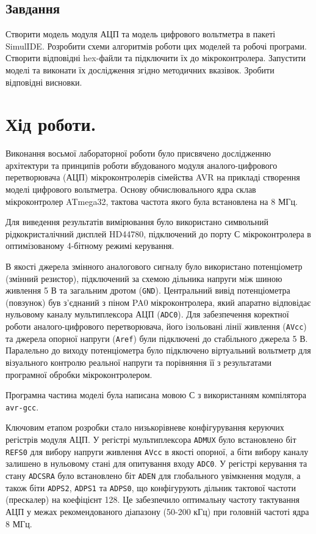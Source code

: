 \documentclass[14pt, a4paper]{extreport}
\begin{document}
	\subsection*{Завдання}
	Створити модель модуля АЦП та модель цифрового вольтметра в пакеті SimulIDE. Розробити схеми алгоритмів роботи цих моделей та робочі програми. Створити відповідні hex-файли та підключити їх до мікроконтролера. Запустити моделі та виконати їх дослідження згідно методичних вказівок. Зробити відповідні висновки.
	
	\section*{Хід роботи.}
	
	Виконання восьмої лабораторної роботи було присвячено дослідженню архітектури та принципів роботи вбудованого модуля аналого-цифрового перетворювача (АЦП) мікроконтролерів сімейства AVR на прикладі створення моделі цифрового вольтметра. Основу обчислювального ядра склав мікроконтролер ATmega32, тактова частота якого була встановлена на 8 МГц. 
	
	
	Для виведення результатів вимірювання було використано символьний рідкокристалічний дисплей HD44780, підключений до порту С мікроконтролера в оптимізованому 4-бітному режимі керування. 
	
	В якості джерела змінного аналогового сигналу було використано потенціометр (змінний резистор), підключений за схемою дільника напруги між шиною живлення 5 В та загальним дротом (\texttt{GND}). Центральний вивід потенціометра (повзунок) був з'єднаний з піном PA0 мікроконтролера, який апаратно відповідає нульовому каналу мультиплексора АЦП (\texttt{ADC0}). Для забезпечення коректної роботи аналого-цифрового перетворювача, його ізольовані лінії живлення (\texttt{AVcc}) та джерела опорної напруги (\texttt{Aref}) були підключені до стабільного джерела 5 В. Паралельно до виходу потенціометра було підключено віртуальний вольтметр для візуального контролю реальної напруги та порівняння її з результатами програмної обробки мікроконтролером.
	
	
	Програмна частина моделі була написана мовою С з використанням компілятора \texttt{avr-gcc}. 
	
	
	Ключовим етапом розробки стало низькорівневе конфігурування керуючих регістрів модуля АЦП. У регістрі мультиплексора \texttt{ADMUX} було встановлено біт \texttt{REFS0} для вибору напруги живлення \texttt{AVcc} в якості опорної, а біти вибору каналу залишено в нульовому стані для опитування входу \texttt{ADC0}. У регістрі керування та стану \texttt{ADCSRA} було встановлено біт \texttt{ADEN} для глобального увімкнення модуля, а також біти \texttt{ADPS2}, \texttt{ADPS1} та \texttt{ADPS0}, що конфігурують дільник тактової частоти (прескалер) на коефіцієнт 128. Це забезпечило оптимальну частоту тактування АЦП у межах рекомендованого діапазону (50-200 кГц) при головній частоті ядра 8 МГц.
	
\end{document}
